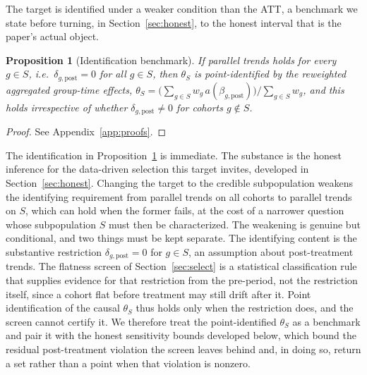 \documentclass[12pt]{article}
\newtheorem{proposition}{Proposition}
\theoremstyle{remark}
\begin{document}
The target is identified under a weaker condition than the ATT, a benchmark we state before turning,
in Section~\ref{sec:honest}, to the honest interval that is the paper's actual object.

\begin{proposition}[Identification benchmark]\label{prop:id}
If parallel trends holds for every $g\in S$, i.e.\ $\delta_{g,\mathrm{post}}=0$ for all $g\in S$, then
$\theta_S$ is point-identified by the reweighted aggregated group-time effects,
$\theta_S = \big(\sum_{g\in S} w_g\,a(\beta_{g,\mathrm{post}})\big)/\sum_{g\in S} w_g$, and this holds
irrespective of whether $\delta_{g,\mathrm{post}}\neq 0$ for cohorts $g\notin S$.
\end{proposition}

\begin{proof}
See Appendix~\ref{app:proofs}.
\end{proof}

The identification in Proposition~\ref{prop:id} is immediate. The substance is the honest inference for the
data-driven selection this target invites, developed in Section~\ref{sec:honest}. Changing the target to the
credible subpopulation weakens the identifying requirement from parallel trends on all cohorts to parallel
trends on $S$, which can hold when the former fails, at the cost of a narrower question whose subpopulation
$S$ must then be characterized. The weakening is genuine but conditional, and two things must be kept
separate. The identifying content is the substantive restriction $\delta_{g,\mathrm{post}}=0$ for $g\in S$,
an assumption about post-treatment trends. The flatness screen of Section~\ref{sec:select} is a statistical
classification rule that supplies evidence for that restriction from the pre-period, not the restriction
itself, since a cohort flat before treatment may still drift after it. Point identification of the causal
$\theta_S$ thus holds only when the restriction does, and the screen cannot certify it. We therefore treat
the point-identified $\theta_S$ as a benchmark and pair it with the honest sensitivity bounds developed
below, which bound the residual post-treatment violation the screen leaves behind and, in doing so,
return a set rather than a point when that violation is nonzero.
\end{document}
